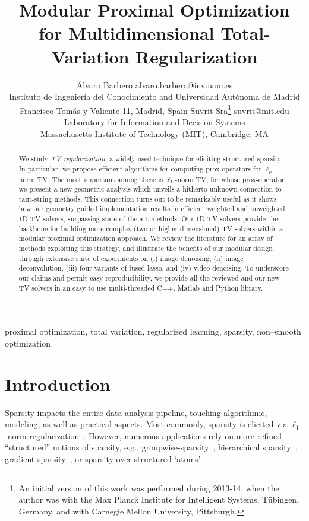 \documentclass[twoside,11pt]{article}
\numberwithin{equation}{section}
\numberwithin{theorem}{section}
\newcommand{\MIT}{Laboratory for Information and Decision Systems\\ Massachusetts Institute of Technology (MIT), Cambridge, MA}
\newcommand{\mpi}{An initial version of this work was performed during 2013-14, when the author was with the Max Planck Institute for Intelligent Systems, Tübingen, Germany, and with Carnegie Mellon University, Pittsburgh.}
\newcommand{\iisc}{Instituto de Ingenier\'ia del Conocimiento and Universidad Aut\'onoma de Madrid\\Francisco Tom\'as y Valiente 11, Madrid, Spain}
\begin{document}
\title{Modular Proximal Optimization for Multidimensional Total-Variation Regularization}
\author{\name \'Alvaro Barbero
  \email alvaro.barbero@inv.uam.es\\
  \addr \iisc
  \AND
  \name Suvrit Sra\thanks{\mpi} \email suvrit@mit.edu\\
  \addr \MIT
}

\maketitle

\begin{abstract}%
  We study \emph{TV regularization}, a widely used technique for eliciting structured sparsity. In particular, we propose efficient algorithms for computing prox-operators for $\ell_p$-norm TV. The most important among these is $\ell_1$-norm TV, for whose prox-operator we present a new geometric analysis which unveils a hitherto unknown connection to taut-string methods. This connection turns out to be remarkably useful as it shows how our geometry guided implementation results in efficient weighted and unweighted 1D-TV solvers, surpassing   state-of-the-art methods. Our 1D-TV solvers provide the backbone for building more complex (two or higher-dimensional) TV solvers within a modular proximal optimization approach. We review the literature for an array of methods exploiting this strategy, and illustrate the benefits of our modular design through extensive suite of experiments on (i) image denoising, (ii) image deconvolution, (iii) four variants of fused-lasso, and (iv) video denoising. To underscore our claims and permit easy reproducibility, we provide all the reviewed and our new TV solvers in an easy to use multi-threaded C++, Matlab and Python library.
\end{abstract}

\begin{keywords}
   proximal optimization, total variation, regularized learning, sparsity, non--smooth optimization
\end{keywords}

\section{Introduction}
Sparsity impacts the entire data analysis pipeline, touching algorithmic, modeling, as well as practical aspects. Most commonly, sparsity is elicited via $\ell_1$-norm regularization~\citep{LASSO,candesTao04}. However, numerous applications rely on  more refined ``structured'' notions of sparsity, e.g., groupwise-sparsity~\citep{Meier08,liu09b,yuan06,bach11}, hierarchical  sparsity~\citep{bach10,Mairal10}, gradient sparsity~\citep{RudinTV92,vogel,fl}, or sparsity over structured `atoms'~\citep{atomic}.
\end{document}
